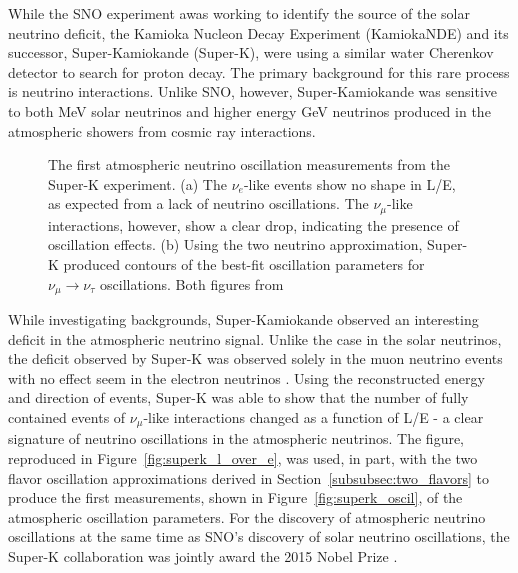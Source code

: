 While the SNO experiment awas working to identify the source of the solar neutrino deficit, the Kamioka Nucleon Decay Experiment (KamiokaNDE) and its successor, Super-Kamiokande (Super-K), were using a similar water Cherenkov detector to search for proton decay.
The primary background for this rare process is neutrino interactions.
Unlike SNO, however, Super-Kamiokande was sensitive to both MeV solar neutrinos and higher energy GeV neutrinos produced in the atmospheric showers from cosmic ray interactions. 

\begin{figure}[!h]%
	\centering
	\caption{The first atmospheric neutrino oscillation measurements from the Super-K experiment. (a) The $\nu_e$-like events show no shape in L/E, as expected from a lack of neutrino oscillations. The $\nu_\mu$-like interactions, however, show a clear drop, indicating the presence of oscillation effects. (b) Using the two neutrino approximation, Super-K produced contours of the best-fit oscillation parameters for $\nu_\mu\rightarrow\nu_\tau$ oscillations. Both figures from \cite{SuperK-Oscillations}}%
\end{figure}


While investigating backgrounds, Super-Kamiokande observed an interesting deficit in the atmospheric neutrino signal.
Unlike the case in the solar neutrinos, the deficit observed by Super-K was observed solely in the muon neutrino events with no effect seem in the electron neutrinos \cite{SuperK-Oscillations}.
Using the reconstructed energy and direction of events, Super-K was able to show that the number of fully contained events of $\nu_\mu$-like interactions changed as a function of L/E - a clear signature of neutrino oscillations in the atmospheric neutrinos.
The figure, reproduced in Figure~\ref{fig:superk_l_over_e}, was used, in part, with the two flavor oscillation approximations derived in Section~\ref{subsubsec:two_flavors} to produce the first measurements, shown in Figure~\ref{fig:superk_oscil}, of the atmospheric oscillation parameters.
For the discovery of atmospheric neutrino oscillations at the same time as SNO's discovery of solar neutrino oscillations, the Super-K collaboration was jointly award the 2015 Nobel Prize \cite{NobelPrize:2015-Oscillations}.


